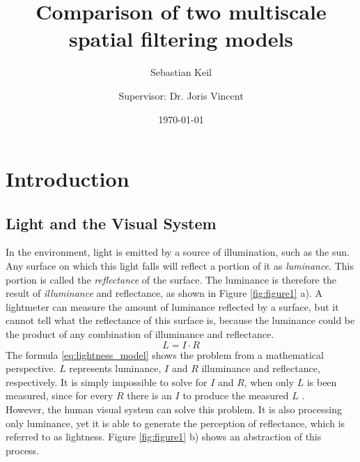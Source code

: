 

\subject{Bachelor Thesis}
\title{Comparison of two multiscale spatial filtering models}
\author[]{Sebastian Keil}
\author[]{Supervisor: Dr. Joris Vincent}
\date{\today}



\maketitle
\thispagestyle{empty}


\renewcommand*\contentsname{Summary}
\tableofcontents

\raggedright
\newpage

\setcounter{page}{1}
\section{Introduction}
\subsection{Light and the Visual System}

In the environment, light is emitted by a source of illumination, such as the sun. Any
surface on which this light falls will reflect a portion of it as \emph{luminance}. This
portion is called the \emph{reflectance} of the surface. The luminance is therefore the
result of \emph{illuminance} and reflectance, as shown in Figure \ref*{fig:figure1} a). A
lightmeter can measure the amount of luminance reflected by a surface, but it cannot tell
what the reflectance of this surface is, because the luminance could be the product of any
combination of illuminance and reflectance.
\begin{equation}
    L = I \cdot R
    \label{eq:lightness_model}
\end{equation} 
The formula \ref*{eq:lightness_model} shows the problem from a mathematical perspective.
\(L\) represents luminance, \(I\) and \(R\) illuminance and reflectance, respectively. It
is simply impossible to solve for \(I\) and \(R\), when only \(L\) is been measured, since
for every \(R\) there is an \(I\) to produce the measured \(L\) \parencite{adelson2000}.
\\ 
However, the human visual system can solve this problem. It is also processing only
luminance, yet it is able to generate the perception of reflectance, which is referred to
as lightness. Figure \ref*{fig:figure1} b) shows an abstraction of this process.

